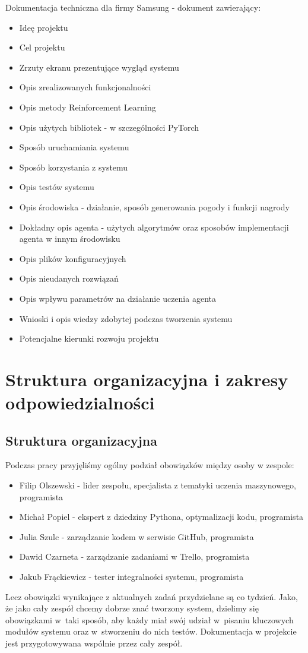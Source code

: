 \documentclass{article}
\begin{document}
Dokumentacja techniczna dla firmy Samsung - dokument zawierający:
\begin{itemize}
\item Ideę projektu
\item Cel projektu
\item Zrzuty ekranu prezentujące wygląd systemu
\item Opis zrealizowanych funkcjonalności
\item Opis metody Reinforcement Learning
\item Opis użytych bibliotek - w szczególności PyTorch
\item Sposób uruchamiania systemu
\item Sposób korzystania z systemu
\item Opis testów systemu
\item Opis środowiska - działanie, sposób generowania pogody i funkcji nagrody
\item Dokładny opis agenta - użytych algorytmów oraz sposobów implementacji agenta w innym środowisku
\item Opis plików konfiguracyjnych
\item Opis nieudanych rozwiązań
\item Opis wpływu parametrów na działanie uczenia agenta
\item Wnioski i opis wiedzy zdobytej podczas tworzenia systemu
\item Potencjalne kierunki rozwoju projektu
\end{itemize}

\section{Struktura organizacyjna i zakresy odpowiedzialności}
\subsection{Struktura organizacyjna}
Podczas pracy przyjęliśmy ogólny podział obowiązków między osoby w zespole:

\begin{itemize}
\item Filip Olszewski - lider zespołu, specjalista z tematyki uczenia maszynowego, programista
\item Michał Popiel - ekspert z dziedziny Pythona, optymalizacji kodu, programista
\item Julia Szulc - zarządzanie kodem w serwisie GitHub, programista
\item Dawid Czarneta - zarządzanie zadaniami w Trello, programista
\item Jakub Frąckiewicz - tester integralności systemu, programista
\end{itemize}
Lecz obowiązki wynikające z aktualnych zadań przydzielane są co tydzień. Jako, że jako cały zespół chcemy dobrze znać tworzony system, dzielimy się obowiązkami w~taki sposób, aby każdy miał swój udział w~pisaniu  kluczowych modułów systemu oraz w~stworzeniu do nich testów.
Dokumentacja w projekcie jest przygotowywana wspólnie przez cały zespół.
\end{document}
